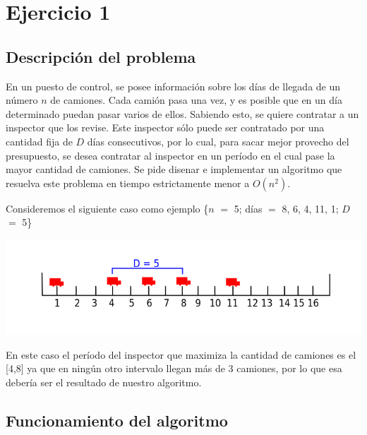 \section{Ejercicio 1}

\subsection{Descripci\'on del problema}

En un puesto de control, se posee informaci\'on sobre los d\'ias de llegada de un n\'umero $n$ de camiones. Cada cami\'on pasa una vez, y es posible que en un d\'ia determinado puedan pasar varios de ellos. Sabiendo esto, se quiere contratar a un inspector que los revise. Este inspector s\'olo puede ser contratado por una cantidad fija de $D$ d\'ias consecutivos, por lo cual, para sacar mejor provecho del presupuesto, se desea contratar al inspector en un per\'iodo en el cual pase la mayor cantidad de camiones. Se pide disenar e implementar un algoritmo que resuelva este problema en tiempo estrictamente menor a $O(n^2)$.

\vspace{2mm}

Consideremos el siguiente caso como ejemplo \{$n$ $=$ 5; d\'ias $=$ 8, 6, 4, 11, 1; $D$ $=$ 5\}

\vspace{3mm}

\includegraphics[scale=0.6]{images/intervalo}

\vspace{3mm}

En este caso el per\'iodo del inspector que maximiza la cantidad de camiones es el [4,8] ya que en ning\'un otro intervalo llegan m\'as de 3 camiones, por lo que esa deber\'ia ser el resultado de nuestro algoritmo.

\subsection{Funcionamiento del algoritmo}

\hspace{2mm}

